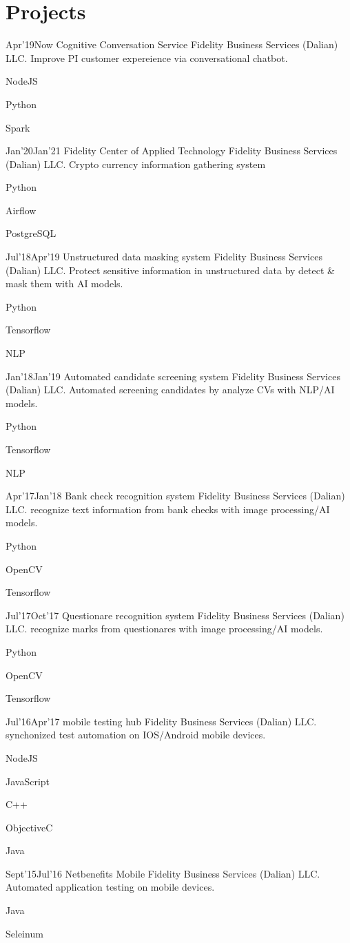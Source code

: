 \documentclass[]{lubricy-cv}
\begin{document}
\section{Projects}
\begin{entrylist}
  \entry
    {Apr'19}{Now}
    {Cognitive Conversation Service}
    {Fidelity Business Services (Dalian) LLC.}
    {Improve PI customer expereience via conversational chatbot.}
    {
      \item NodeJS
      \item Python
      \item Spark }
    {Jan'20}{Jan'21}
    {Fidelity Center of Applied Technology}
    {Fidelity Business Services (Dalian) LLC.}
    {Crypto currency information gathering system}
    {
      \item Python
      \item Airflow
      \item PostgreSQL
    }
  \entry
    {Jul'18}{Apr'19}
    {Unstructured data masking system}
    {Fidelity Business Services (Dalian) LLC.}
    {Protect sensitive information in unstructured data by detect \& mask them with AI models.}
    {
      \item Python
      \item Tensorflow
      \item NLP }
  \entry
    {Jan'18}{Jan'19}
    {Automated candidate screening system}
    {Fidelity Business Services (Dalian) LLC.}
    {Automated screening candidates by analyze CVs with NLP/AI models.}
    {
      \item Python
      \item Tensorflow
      \item NLP}
  \entry
    {Apr'17}{Jan'18}
    {Bank check recognition system}
    {Fidelity Business Services (Dalian) LLC.}
    {recognize text information from bank checks with image processing/AI models.}
    {
      \item Python
      \item OpenCV
      \item Tensorflow}
  \entry
    {Jul'17}{Oct'17}
    {Questionare recognition system}
    {Fidelity Business Services (Dalian) LLC.}
    {recognize marks from questionares with image processing/AI models.}
    {
      \item Python
      \item OpenCV
      \item Tensorflow}
  \entry
    {Jul'16}{Apr'17}
    {mobile testing hub}
    {Fidelity Business Services (Dalian) LLC.}
    {synchonized test automation on IOS/Android mobile devices.}
    {
      \item NodeJS
      \item JavaScript
      \item C++
      \item ObjectiveC
      \item Java}
  \entry
    {Sept'15}{Jul'16}
    {Netbenefits Mobile}
    {Fidelity Business Services (Dalian) LLC.}
    {Automated application testing on mobile devices.}
    {
      \item Java
      \item Seleinum}
\end{entrylist}
~
\end{document}
